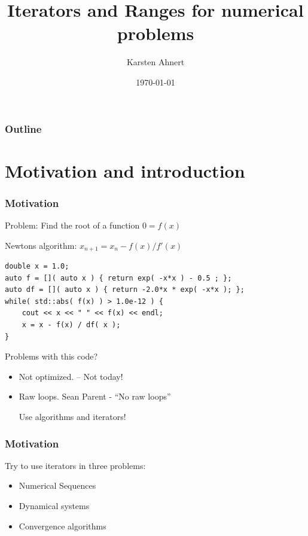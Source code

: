 \documentclass{beamer}
\title[Iteratorst]{Iterators and Ranges for numerical problems}
\author[Karsten Ahnert]{Karsten Ahnert}
\institute[Ambrosys]{Ambrosys GmbH, Potsdam}
\date{\today}
\newcommand{\heading}[1]{\frametitle{#1}}
\begin{document}
\frame{
  \titlepage


}



\begin{frame}
  \heading{Outline}

  \tableofcontents
\end{frame}



\section{Motivation and introduction}




\begin{frame}[fragile]
\heading{Motivation}

Problem: Find the root of a function \hspace{2ex} $0=f(x)$

\vspace{0.5ex}
Newtons algorithm: \hspace{2ex} $x_{n+1} = x_n - f(x)/f'(x)$
\vspace{2ex}
  \begin{lstlisting}[basicstyle=\scriptsize\ttfamily]
double x = 1.0;
auto f = []( auto x ) { return exp( -x*x ) - 0.5 ; };
auto df = []( auto x ) { return -2.0*x * exp( -x*x ); };
while( std::abs( f(x) ) > 1.0e-12 ) {
    cout << x << " " << f(x) << endl;
    x = x - f(x) / df( x );
}
  \end{lstlisting}
\vspace{2ex}
Problems with this code?

\pause
\begin{itemize}
 \item Not optimized. \pause -- Not today!
 \item Raw loops. Sean Parent - ``No raw loops''
 
 \vspace{0.5ex}
 Use algorithms and iterators!
\end{itemize}
 
\end{frame}



\begin{frame}[fragile]
 \heading{Motivation}
 
 Try to use iterators in three problems:
 
 \begin{itemize}
  \item Numerical Sequences
  \item Dynamical systems
  \item Convergence algorithms
 \end{itemize}

\end{frame}
\end{document}
